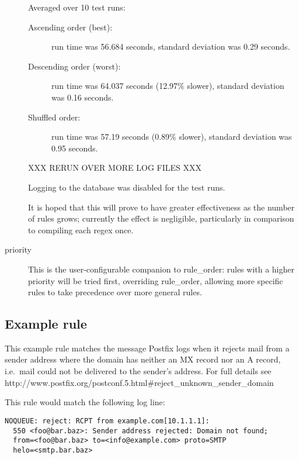 \documentclass[a4paper,12pt,draft]{article}
\begin{document}
\begin{description}
        Averaged over 10 test runs:

        \begin{description} 

            \item [Ascending order (best):] run time was 56.684 seconds,
                standard deviation was 0.29 seconds.

            \item [Descending order (worst):] run time was 64.037
                seconds (12.97\% slower), standard deviation was 0.16
                seconds.

            \item [Shuffled order:] run time was 57.19 seconds
                (0.89\% slower), standard deviation was 0.95 seconds.

        \end{description}

        XXX RERUN OVER MORE LOG FILES XXX

        Logging to the database was disabled for the test runs.

        It is hoped that this will prove to have greater effectiveness as
        the number of rules grows; currently the effect is negligible,
        particularly in comparison to compiling each regex once.

    \item [priority] This is the user-configurable companion to
        rule\_order: rules with a higher priority will be tried first,
        overriding rule\_order, allowing more specific rules to take
        precedence over more general rules.

\end{description}


\subsection{Example rule}

This example rule matches the message Postfix logs when it rejects mail
from a sender address where the domain has neither an MX record nor an A
record, i.e.\ mail could not be delivered to the sender's address.  For full
details see
http://www.postfix.org/postconf.5.html\#reject\_unknown\_sender\_domain

This rule would match the following log line:

\begin{verbatim}
NOQUEUE: reject: RCPT from example.com[10.1.1.1]: 
  550 <foo@bar.baz>: Sender address rejected: Domain not found;
  from=<foo@bar.baz> to=<info@example.com> proto=SMTP
  helo=<smtp.bar.baz>
\end{verbatim}
\end{document}
